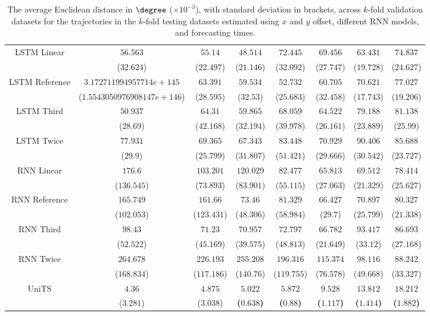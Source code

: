 \begin{table}[!ht]
{\begin{tabular}{|c|c|c|c|c|c|c|c|}
			\multirow{2}{*}{LSTM Linear} & $56.563$ & $55.14$ & $48.514$ & $72.445$ & $69.456$ & $63.431$ & $74.837$ \\
			 & ($32.624$) & ($22.497$) & ($21.146$) & ($32.092$) & ($27.747$) & ($19.728$) & ($24.627$) \\ \hline
			\multirow{2}{*}{LSTM Reference} & $3.172711994957714e+145$ & $63.391$ & $59.534$ & $52.732$ & $60.705$ & $70.621$ & $77.027$ \\
			 & ($1.5543050976908147e+146$) & ($28.595$) & ($32.53$) & ($25.683$) & ($32.458$) & ($17.743$) & ($19.206$) \\ \hline
			\multirow{2}{*}{LSTM Third} & $50.937$ & $64.31$ & $59.865$ & $68.059$ & $64.522$ & $79.188$ & $81.138$ \\
			 & ($28.69$) & ($42.168$) & ($32.194$) & ($39.978$) & ($26.161$) & ($23.889$) & ($25.99$) \\ \hline
			\multirow{2}{*}{LSTM Twice} & $77.931$ & $69.365$ & $67.343$ & $83.448$ & $70.929$ & $90.406$ & $85.688$ \\
			 & ($29.9$) & ($25.799$) & ($31.807$) & ($51.421$) & ($29.666$) & ($30.542$) & ($23.727$) \\ \hline
			\multirow{2}{*}{RNN Linear} & $176.6$ & $103.201$ & $120.029$ & $82.477$ & $65.813$ & $69.512$ & $78.414$ \\
			 & ($136.545$) & ($73.893$) & ($83.901$) & ($55.115$) & ($27.063$) & ($21.329$) & ($25.627$) \\ \hline
			\multirow{2}{*}{RNN Reference} & $165.749$ & $161.66$ & $73.46$ & $81.329$ & $66.427$ & $70.897$ & $80.327$ \\
			 & ($102.053$) & ($123.431$) & ($48.306$) & ($58.984$) & ($29.7$) & ($25.799$) & ($21.338$) \\ \hline
			\multirow{2}{*}{RNN Third} & $98.43$ & $71.23$ & $70.957$ & $72.797$ & $66.782$ & $93.417$ & $86.693$ \\
			 & ($52.522$) & ($45.169$) & ($39.575$) & ($48.813$) & ($21.649$) & ($33.12$) & ($27.168$) \\ \hline
			\multirow{2}{*}{RNN Twice} & $264.678$ & $226.193$ & $255.208$ & $196.316$ & $115.374$ & $98.116$ & $88.242$ \\
			 & ($168.834$) & ($117.186$) & ($140.76$) & ($119.755$) & ($76.578$) & ($49.668$) & ($33.327$) \\ \hline
			\multirow{2}{*}{UniTS} & $4.36$ & $4.875$ & $\mathbf{5.022}$ & $\mathbf{5.872}$ & $\mathbf{9.528}$ & $\mathbf{13.812}$ & $\mathbf{18.212}$ \\
			 & ($3.281$) & ($3.038$) & \textbf{(}$\mathbf{0.638}$\textbf{)} & \textbf{(}$\mathbf{0.88}$\textbf{)} & \textbf{(}$\mathbf{1.117}$\textbf{)} & \textbf{(}$\mathbf{1.414}$\textbf{)} & \textbf{(}$\mathbf{1.882}$\textbf{)} \\ \hline
		\end{tabular}
	}
	\caption{The average Euclidean distance in $\degree$ ($\times 10^{-3}$), with standard deviation in brackets, across $k$-fold validation datasets for the trajectories in the $k$-fold testing datasets estimated using $x$ and $y$ offset, different RNN models, and forecasting times.}
	\label{tab:all_no_abs_euclid}
\end{table}

